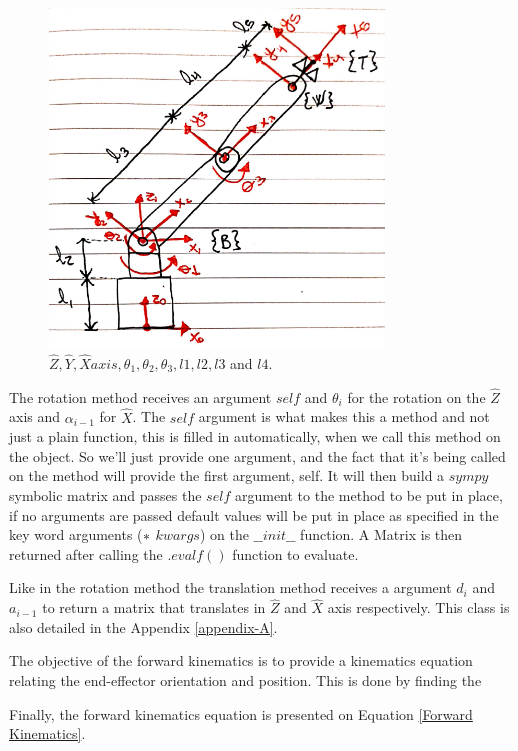 \documentclass[transmag]{IEEEtran}
\begin{document}
\begin{figure}
\centerline{\includegraphics[width=3.5in]{./images/Axis}}
\caption{$\hat Z, \hat Y, \hat X axis, \theta_1, \theta_2, \theta_3, l1, l2, l3$ and $l4$.\label{Axis}}
\end{figure}

The rotation method receives an argument $self$ and $\theta_i$ for the rotation on the $\hat Z$ axis and $\alpha_{i-1}$ for $\hat X$. The $self$ argument is what makes this a method and not just a plain function, this is filled in automatically, when we call this method on the object. So we'll just provide one argument, and the fact that it's being called on the method will provide the first argument, self. It will then build a $sympy$ symbolic matrix and passes the $self$ argument to the method to be put in place, if no arguments are passed default values will be put in place as specified in the key word arguments ($\**$ $kwargs$) on the $\_\_init\_\_$ function. A Matrix is then returned after calling the $.evalf()$ function to evaluate.

Like in the rotation method the translation method receives a argument $d_i$ and $a_{i-1}$ to return a matrix that translates in $\hat Z$ and $\hat X$ axis respectively. This class is also detailed in the Appendix \ref{appendix-A}.  

The objective of the forward kinematics is to provide a kinematics equation relating the end-effector orientation and position. This is done by finding the 

Finally, the forward kinematics equation is presented on Equation \ref{Forward Kinematics}.
\end{document}
